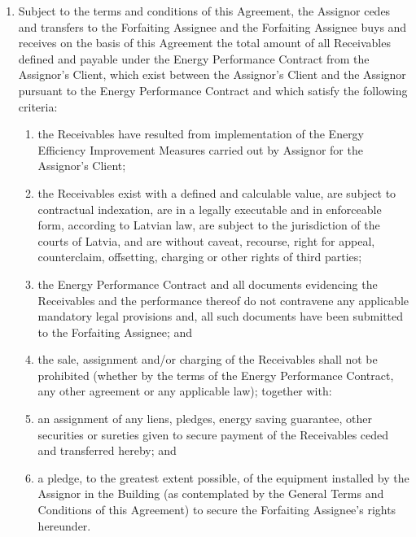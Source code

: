 \documentclass[a4paper]{article}
\begin{document}
\begin{enumerate}
\item{Subject to the terms and conditions of this Agreement, the
    Assignor cedes and transfers to the Forfaiting Assignee and the
    Forfaiting Assignee buys and receives on the basis of this
    Agreement the total amount of all Receivables defined and payable
    under the Energy Performance Contract from the Assignor’s Client,
    which exist between the Assignor’s Client and the Assignor
    pursuant to the Energy Performance Contract and which satisfy the
    following criteria:}

  \begin{enumerate}
  \item{the Receivables have resulted from implementation of the
      Energy Efficiency Improvement Measures carried out by Assignor
      for the Assignor’s Client;}

  \item{the Receivables exist with a defined and calculable value, are
      subject to contractual indexation, are in a legally executable
      and in enforceable form, according to Latvian law, are subject
      to the jurisdiction of the courts of Latvia, and are without
      caveat, recourse, right for appeal, counterclaim, offsetting,
      charging or other rights of third parties;}

  \item{the Energy Performance Contract and all documents evidencing
      the Receivables and the performance thereof do not contravene
      any applicable mandatory legal provisions and, all such
      documents have been submitted to the Forfaiting Assignee; and}

  \item{the sale, assignment and/or charging of the Receivables shall
      not be prohibited (whether by the terms of the Energy
      Performance Contract, any other agreement or any applicable
      law); together with:}

  \item{an assignment of any liens, pledges, energy saving guarantee,
      other securities or sureties given to secure payment of the
      Receivables ceded and transferred hereby; and }

  \item{a pledge, to the greatest extent possible, of the equipment
      installed by the Assignor in the Building (as contemplated by
      the General Terms and Conditions of this Agreement) to secure
      the Forfaiting Assignee's rights hereunder.}
  \end{enumerate}


\end{enumerate}
\end{document}
